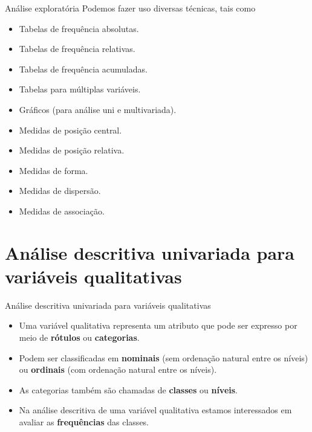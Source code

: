 \documentclass[
  ignorenonframetext,
  serif,
  professionalfont,
  usenames,
  dvipsnames,
  aspectratio = 169]{beamer}
\providecommand{\tightlist}{%
  \setlength{\itemsep}{0pt}\setlength{\parskip}{0pt}}
\renewcommand{\tightlist}{%
  \setlength{\itemsep}{0\baselineskip}
  \setlength{\parskip}{0.25\baselineskip}
}
\def\beginAHalfColumn{\begin{minipage}{0.49\textwidth}}%
\def\endColumns{\end{minipage}}%
\begin{document}
\begin{frame}{Análise exploratória}
\protect\hypertarget{anuxe1lise-exploratuxf3ria-3}{}
Podemos fazer uso diversas técnicas, tais como

\beginAHalfColumn

\begin{itemize}
\item
  Tabelas de frequência absolutas.
\item
  Tabelas de frequência relativas.
\item
  Tabelas de frequência acumuladas.
\item
  Tabelas para múltiplas variáveis.
\item
  Gráficos (para análise uni e multivariada).
\end{itemize}

\endColumns
\beginAHalfColumn

\begin{itemize}
\tightlist
\item
  Medidas de posição central.
\item
  Medidas de posição relativa.
\item
  Medidas de forma.
\item
  Medidas de dispersão.
\item
  Medidas de associação.
\end{itemize}

\endColumns
\end{frame}

\hypertarget{anuxe1lise-descritiva-univariada-para-variuxe1veis-qualitativas}{%
\section{Análise descritiva univariada para variáveis
qualitativas}\label{anuxe1lise-descritiva-univariada-para-variuxe1veis-qualitativas}}

\begin{frame}{Análise descritiva univariada para variáveis qualitativas}
\protect\hypertarget{anuxe1lise-descritiva-univariada-para-variuxe1veis-qualitativas-1}{}
\begin{itemize}
\item
  Uma variável qualitativa representa um atributo que pode ser expresso
  por meio de \textbf{rótulos} ou \textbf{categorias}.
\item
  Podem ser classificadas em \textbf{nominais} (sem ordenação natural
  entre os níveis) ou \textbf{ordinais} (com ordenação natural entre os
  níveis).
\item
  As categorias também são chamadas de \textbf{classes} ou
  \textbf{níveis}.
\item
  Na análise descritiva de uma variável qualitativa estamos interessados
  em avaliar as \textbf{frequências} das classes.
\end{itemize}
\end{frame}
\end{document}
